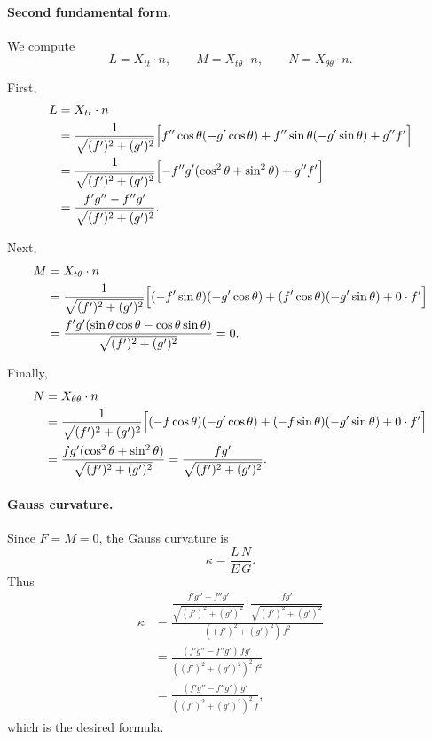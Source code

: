 \documentclass[12pt,a4paper]{article}
\theoremstyle{plain}
\theoremstyle{definition}      %
\begin{document}
\paragraph{Second fundamental form.}
We compute
\[
L = X_{tt}\cdot n,\qquad
M = X_{t\theta}\cdot n,\qquad
N = X_{\theta\theta}\cdot n.
\]

First,
\[
\begin{aligned}
	L
	&= X_{tt}\cdot n \\
	&= \frac{1}{\sqrt{(f')^2+(g')^2}}
	\Bigl[
	f''\cos\theta(-g'\cos\theta)
	+f''\sin\theta(-g'\sin\theta)
	+g'' f'
	\Bigr] \\
	&= \frac{1}{\sqrt{(f')^2+(g')^2}}
	\Bigl[ -f''g'(\cos^2\theta+\sin^2\theta) + g''f' \Bigr] \\
	&= \frac{f'g''-f''g'}{\sqrt{(f')^2+(g')^2}}.
\end{aligned}
\]

Next,
\[
\begin{aligned}
	M
	&= X_{t\theta}\cdot n \\
	&= \frac{1}{\sqrt{(f')^2+(g')^2}}
	\Bigl[
	(-f'\sin\theta)(-g'\cos\theta)
	+ (f'\cos\theta)(-g'\sin\theta)
	+ 0\cdot f'
	\Bigr] \\
	&= \frac{f'g'(\sin\theta\cos\theta-\cos\theta\sin\theta)}{\sqrt{(f')^2+(g')^2}}
	= 0.
\end{aligned}
\]

Finally,
\[
\begin{aligned}
	N
	&= X_{\theta\theta}\cdot n \\
	&= \frac{1}{\sqrt{(f')^2+(g')^2}}
	\Bigl[
	(-f\cos\theta)(-g'\cos\theta)
	+(-f\sin\theta)(-g'\sin\theta)
	+0\cdot f'
	\Bigr] \\
	&= \frac{fg'(\cos^2\theta+\sin^2\theta)}{\sqrt{(f')^2+(g')^2}}
	= \frac{fg'}{\sqrt{(f')^2+(g')^2}}.
\end{aligned}
\]

\paragraph{Gauss curvature.}
Since $F=M=0$, the Gauss curvature is
\[
\kappa = \frac{L\,N}{E\,G}.
\]
Thus
\[
\begin{aligned}
	\kappa
	&= \frac{\dfrac{f'g''-f''g'}{\sqrt{(f')^2+(g')^2}}
		\cdot
		\dfrac{fg'}{\sqrt{(f')^2+(g')^2}}}
	{((f')^2+(g')^2)\,f^2} \\
	&= \frac{(f'g''-f''g')\,fg'}
	{((f')^2+(g')^2)^2\,f^2} \\
	&= \frac{(f'g''-f''g')\,g'}
	{((f')^2+(g')^2)^2\,f},
\end{aligned}
\]
which is the desired formula.
\end{document}
